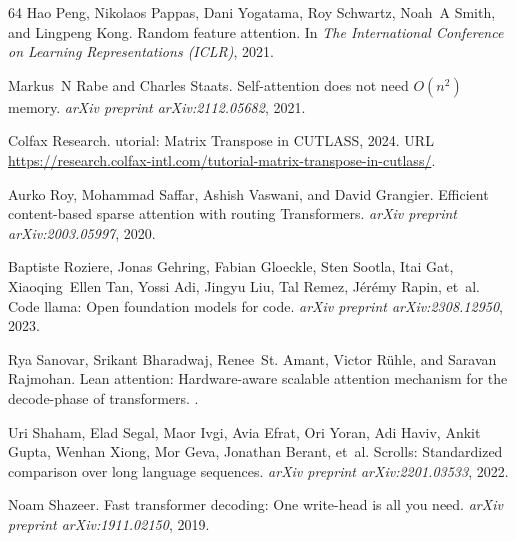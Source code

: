 \documentclass{article}
\begin{document}
\begin{thebibliography}{64}
Hao Peng, Nikolaos Pappas, Dani Yogatama, Roy Schwartz, Noah~A Smith, and
  Lingpeng Kong.
\newblock Random feature attention.
\newblock In \emph{The International Conference on Learning Representations
  ({ICLR})}, 2021.

Markus~N Rabe and Charles Staats.
\newblock Self-attention does not need $ {O} (n^2) $ memory.
\newblock \emph{arXiv preprint arXiv:2112.05682}, 2021.

Colfax Research.
utorial: {M}atrix {T}ranspose in {CUTLASS}, 2024.
\newblock URL
  \url{https://research.colfax-intl.com/tutorial-matrix-transpose-in-cutlass/}.

Aurko Roy, Mohammad Saffar, Ashish Vaswani, and David Grangier.
\newblock Efficient content-based sparse attention with routing {T}ransformers.
\newblock \emph{arXiv preprint arXiv:2003.05997}, 2020.

Baptiste Roziere, Jonas Gehring, Fabian Gloeckle, Sten Sootla, Itai Gat,
  Xiaoqing~Ellen Tan, Yossi Adi, Jingyu Liu, Tal Remez, J{\'e}r{\'e}my Rapin,
  et~al.
\newblock Code llama: Open foundation models for code.
\newblock \emph{arXiv preprint arXiv:2308.12950}, 2023.

Rya Sanovar, Srikant Bharadwaj, Renee~St. Amant, Victor Rühle, and Saravan
  Rajmohan.
\newblock Lean attention: Hardware-aware scalable attention mechanism for the
  decode-phase of transformers.
.

Uri Shaham, Elad Segal, Maor Ivgi, Avia Efrat, Ori Yoran, Adi Haviv, Ankit
  Gupta, Wenhan Xiong, Mor Geva, Jonathan Berant, et~al.
\newblock Scrolls: Standardized comparison over long language sequences.
\newblock \emph{arXiv preprint arXiv:2201.03533}, 2022.

Noam Shazeer.
\newblock Fast transformer decoding: One write-head is all you need.
\newblock \emph{arXiv preprint arXiv:1911.02150}, 2019.


\end{thebibliography}
\end{document}
